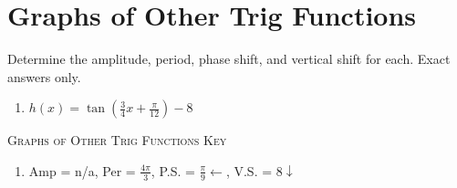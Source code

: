 \chapter{Graphs of Other Trig Functions}

Determine the amplitude, period, phase shift, and vertical shift for each. Exact answers only.

\begin{enumerate}
	\item $h(x) = \tan\left(\frac{3}{4}x + \frac{\pi}{12}\right) - 8$
\end{enumerate}

\newpage

\textsc{Graphs of Other Trig Functions Key}

\begin{enumerate}
	\item Amp = n/a, Per = $\frac{4\pi}{3}$, P.S. = $\frac{\pi}{9} \leftarrow$, V.S. = $8 \downarrow$
\end{enumerate}